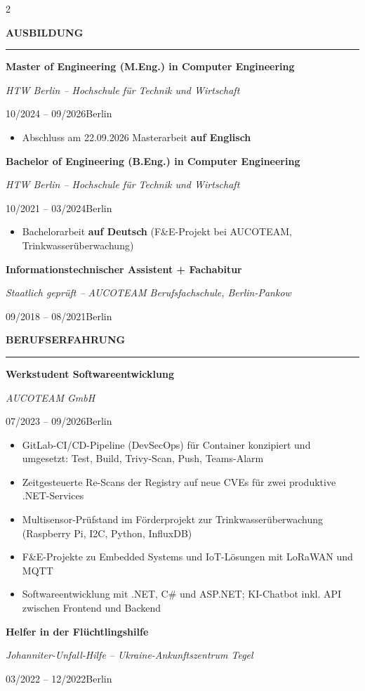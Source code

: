 \documentclass[10pt,a4paper]{article}
\newcommand{\cvsection}[1]{%
  \vspace{7pt}%
  {\large\bfseries\MakeUppercase{#1}}\\[-7pt]
  \rule{\linewidth}{0.6pt}\par\vspace{4pt}}
\newcommand{\cventry}[4]{%
  {\bfseries #1}\par
  {\itshape\color{black!75}#2}\par
  {\small\color{softgray}#3\hspace{1.2em}#4}\par\vspace{3pt}}
\newenvironment{cvitems}{%
  \begin{itemize}[leftmargin=1.2em,topsep=3pt,itemsep=2pt,parsep=0pt,label=\textbullet]}%
  {\end{itemize}\vspace{4pt}}
\begin{document}
\begin{paracol}{2}
 
\cvsection{Ausbildung}
 
\cventry{Master of Engineering (M.Eng.) in Computer Engineering}
        {HTW Berlin – Hochschule für Technik und Wirtschaft}
        {10/2024 – 09/2026}{Berlin}
\begin{cvitems}
  \item Abschluss am 22.09.2026 \textbar{} Masterarbeit \textbf{auf Englisch}
\end{cvitems}
 
\cventry{Bachelor of Engineering (B.Eng.) in Computer Engineering}
        {HTW Berlin – Hochschule für Technik und Wirtschaft}
        {10/2021 – 03/2024}{Berlin}
\begin{cvitems}
  \item Bachelorarbeit \textbf{auf Deutsch} (F\&E-Projekt bei AUCOTEAM, Trinkwasserüberwachung)
\end{cvitems}
 
\cventry{Informationstechnischer Assistent + Fachabitur}
        {Staatlich geprüft -- AUCOTEAM Berufsfachschule, Berlin-Pankow}
        {09/2018 – 08/2021}{Berlin}
 
\cvsection{Berufserfahrung}
 
\cventry{Werkstudent Softwareentwicklung}
        {AUCOTEAM GmbH}
        {07/2023 – 09/2026}{Berlin}
\begin{cvitems}
  \item GitLab-CI/CD-Pipeline (DevSecOps) für Container kon\-zi\-piert und umgesetzt: Test, Build, Trivy-Scan, Push, Teams-Alarm
  \item Zeitgesteuerte Re-Scans der Registry auf neue CVEs für zwei produktive .NET-Services
  \item Multisensor-Prüfstand im Förderprojekt zur Trink\-wasser\-über\-wachung (Raspberry Pi, I2C, Python, InfluxDB)
  \item F\&E-Projekte zu Embedded Systems und IoT-Lösungen mit LoRaWAN und MQTT
  \item Softwareentwicklung mit .NET, C\# und ASP.NET; KI-Chatbot inkl. API zwischen Frontend und Backend
\end{cvitems}
 
\cventry{Helfer in der Flüchtlingshilfe}
        {Johanniter-Unfall-Hilfe – Ukraine-Ankunftszentrum Tegel}
        {03/2022 – 12/2022}{Berlin}
 

\end{paracol}
\end{document}
